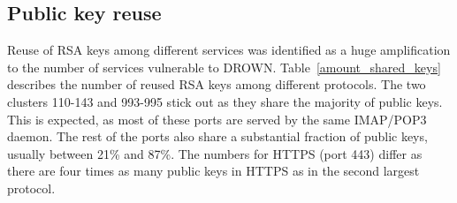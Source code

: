 \subsection{Public key reuse}
\label{sec:pub_key_reuse}

Reuse of RSA keys among different services was identified as a huge
amplification to the number of services vulnerable to DROWN\@.
Table~\ref{amount_shared_keys} describes the number of reused RSA keys among
different protocols. The two clusters 110-143 and 993-995 stick out as they
share the majority of public keys. This is expected, as most of these ports
are served by the same IMAP/POP3 daemon. The rest of the ports also share a
substantial fraction of public keys, usually between 21\% and 87\%. The
numbers for HTTPS (port 443) differ as there are four times as many public
keys in HTTPS as in the second largest protocol.


